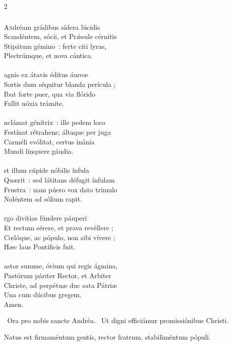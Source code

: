 \documentclass[9pt,twoside]{extarticle}
\begin{document}
\begin{multicols}{2}
{{\subsubsection*{\center {}}
\lettrine{A}ndréam grádibus sídera lúcidis\\
Scandéntem, sócii, et Prǽsule cérnitis\\
Stipátum gémino~: ferte citi lyras,\\
Plectrúmque, et nova cántica.\\
\\
agnis ex átavis éditus áureæ\\
Sortis dum séquitur blanda perícula ;\\
Ibat forte puer, qua via flórido\\
Fallit nóxia trámite.\\
\\
nclámat génitrix~: ille pedem loco\\
Festínat rétrahens; áltaque per juga\\
Carméli evólitat, certus inánia\\
Mundi línquere gáudia.\\
\\
st illum cúpide nóbilis ínfula\\
Quærit~: sed látitans défugit ínfulam\\
Frustra~: nam púero vox data trímulo\\
Noléntem ad sólium rapit.\\
\\
rgo divítias fúndere páuperi\\
Et rectum sérere, et prava revéllere ;\\
Cœlóque, ac pópulo, non sibi vívere ;\\
Hæc laus Pontíficis fuit.\\
\\
astor summe, óvium qui regis ágmina,\\
Pastórum páriter Rector, et Arbiter\\
Christe, ad perpétuæ duc sata Pátriæ\\
Una cum dúcibus gregem.\\
Amen.

\begin{tightlist}{}
\item {}~Ora pro nobis sancte Andréa. ~Ut digni efficiámur promissiónibus Christi.
\item {} Natus est firmaméntum gentis, rector fratrum, stabiliméntum pópuli.
\end{tightlist}

}}
\end{multicols}
\end{document}
